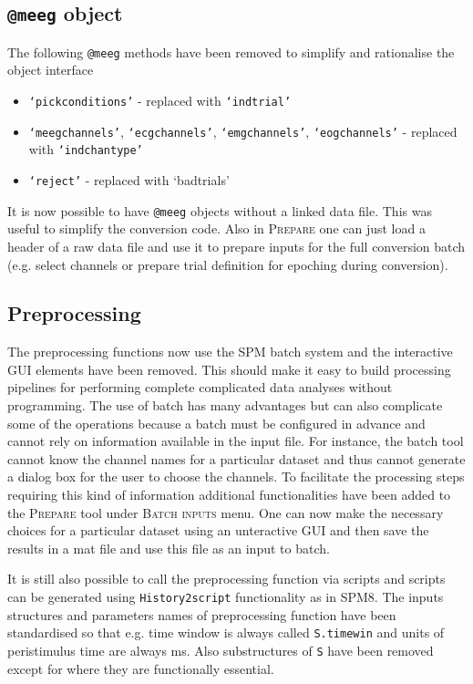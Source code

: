 \documentclass[a4paper,titlepage,openany]{article}
\begin{document}
\subsection{\texttt{@meeg} object}

The following \texttt{@meeg} methods have been removed to simplify and rationalise the object interface
\begin{itemize}
\item \texttt{`pickconditions'} - replaced with \texttt{`indtrial'}
\item \texttt{`meegchannels'}, \texttt{`ecgchannels'}, \texttt{`emgchannels'},  \texttt{`eogchannels'} - replaced with \texttt{`indchantype'}
\item \texttt{`reject'} - replaced with {`badtrials'}
\end{itemize}

It is now possible to have \texttt{@meeg} objects without a linked data file. This was useful to simplify the conversion code. Also in \textsc{Prepare} one can just load a header of a raw data file and use it to prepare inputs for the full conversion batch (e.g. select channels or prepare trial definition for epoching during conversion).

\subsection{Preprocessing}

The preprocessing functions now use the SPM batch system and the interactive GUI elements have been removed. This should make it easy to build processing pipelines for performing complete complicated data analyses without programming. The use of batch has many advantages but can also complicate some of the operations because a batch must be configured in advance and cannot rely on information available in the input file. For instance, the batch tool cannot know the channel names for a particular dataset and thus cannot generate a dialog box for the user to choose the channels. To facilitate the processing steps requiring this kind of information additional functionalities have been added to the \textsc{Prepare} tool under \textsc{Batch inputs} menu. One can now make the necessary choices for a particular dataset using an unteractive GUI and then save the results in a mat file and use this file as an input to batch.

It is still also possible to call the preprocessing function via scripts and scripts can be generated using \texttt{History2script} functionality as in SPM8. The inputs structures and parameters names of preprocessing function have been standardised so that e.g. time window is always called \texttt{S.timewin} and units of peristimulus time are always ms. Also substructures of \texttt{S} have been removed except for where they are functionally essential.
\end{document}
